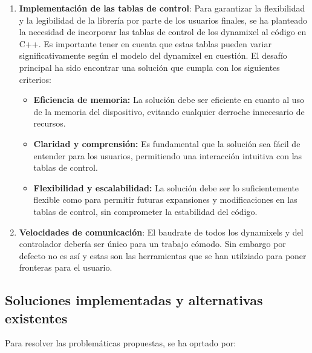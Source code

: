 \documentclass{article}
\begin{document}
\begin{enumerate}
  \item \textbf{Implementación de las tablas de control}: Para garantizar la flexibilidad y la legibilidad de la librería por parte de los usuarios finales, se ha planteado la necesidad de incorporar las tablas de control de los dynamixel al código en C++. Es importante tener en cuenta que estas tablas pueden variar significativamente según el modelo del dynamixel en cuestión. El desafío principal ha sido encontrar una solución que cumpla con los siguientes criterios:
  \begin{itemize}
      \item \textbf{Eficiencia de memoria:} La solución debe ser eficiente en cuanto al uso de la memoria del dispositivo, evitando cualquier derroche innecesario de recursos.

      \item \textbf{Claridad y comprensión:} Es fundamental que la solución sea fácil de entender para los usuarios, permitiendo una interacción intuitiva con las tablas de control.

      \item \textbf{Flexibilidad y escalabilidad:} La solución debe ser lo suficientemente flexible como para permitir futuras expansiones y modificaciones en las tablas de control, sin comprometer la estabilidad del código.
  \end{itemize}
  
  \item \textbf{Velocidades de comunicación}: El baudrate de todos los dynamixels y del controlador debería ser único para un trabajo cómodo. Sin embargo por defecto no es así y estas son las herramientas que se han utilziado para poner fronteras para el usuario.
  
\end{enumerate}

\subsection{Soluciones implementadas y alternativas existentes}
Para resolver las problemáticas propuestas, se ha oprtado por:
\end{document}

